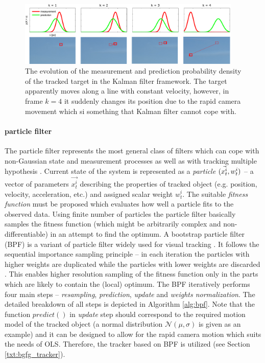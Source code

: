 \begin{figure}[tbh]
	\centering
	\includegraphics[width=0.95\textwidth]{fig/kalman.pdf}
	\caption{The evolution of the measurement and prediction probability density of the tracked target in the Kalman filter framework. The target apparently moves along a line with constant velocity, however, in frame $k = 4$ it suddenly changes its position due to the rapid camera movement which si something that Kalman filter cannot cope with.}
	\label{fig:kalman}
\end{figure}

\paragraph{particle filter} 
The particle filter represents the most general class of filters which can cope with non-Gaussian state and measurement processes as well as with tracking multiple hypothesis \cite{journals/cviu/BimboD11}. Current state of the system is represented as a \textit{particle} $(\vec{x_{t}^{i}},w_{t}^{i})$ -- a vector of parameters ${\vec{x_{t}^{i}}}$ describing the properties of tracked object (e.g. position, velocity, acceleration, etc.) and assigned scalar weight $w_{t}^{i}$. The suitable \textit{fitness function} must be proposed which evaluates how well a particle fits to the observed data. Using finite number of particles the particle filter basically samples the fitness function (which might be arbitrarily complex and non-differentiable) in an attempt to find the optimum. A bootstrap particle filter (BPF) is a variant of particle filter widely used for visual tracking \cite{Isard98condensation}. It follows the sequential importance sampling principle -- in each iteration the particles with higher weights are duplicated while the particles with lower weights are discarded \cite{doucet2001sequential}. This enables higher resolution sampling of the fitness function only in the parts which are likely to contain the (local) optimum. The BPF iteratively performs four main steps -- \textit{resampling}, \textit{prediction}, \textit{update} and \textit{weights normalization}. The detailed breakdown of all steps is depicted in Algorithm \ref{alg:bpf}. Note that the function $predict()$ in \textit{update} step should correspond to the required motion model of the tracked object (a normal distribution $\mathcal{N}(\mu, \sigma)$ is given as an example) and it can be designed to allow for the rapid camera motion which suits the needs of OLS. Therefore, the tracker based on BPF is utilized (see Section \ref{txt:bgfg_tracker}).

